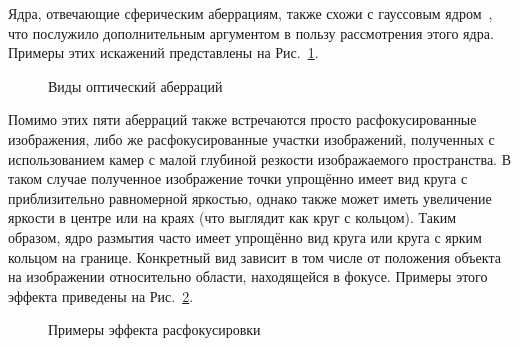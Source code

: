Ядра, отвечающие сферическим аберрациям, также схожи с гауссовым ядром~\cite{simpkins2014parameterized, simpkins2011modeling}, что послужило дополнительным аргументом в пользу рассмотрения этого ядра. Примеры этих искажений представлены на Рис.~\ref{fig:warping-aberrations}.

\begin{figure}[ht]
	\caption{Виды оптический аберраций~\cite{simpkins2011modeling}}
	\label{fig:warping-aberrations}
\end{figure}

Помимо этих пяти аберраций также встречаются просто расфокусированные изображения, либо же расфокусированные участки изображений, полученных с использованием камер с малой глубиной резкости изображаемого пространства. В таком случае полученное изображение точки упрощённо имеет вид круга с приблизительно равномерной яркостью, однако также может иметь увеличение яркости в центре или на краях (что выглядит как круг с кольцом). Таким образом, ядро размытия часто имеет упрощённо вид круга или круга с ярким кольцом на границе. Конкретный вид зависит в том числе от положения объекта на изображении относительно области, находящейся  в фокусе. Примеры этого эффекта приведены на Рис.~\ref{fig:warping-defocus}.

\begin{figure}[ht]
	\caption{Примеры эффекта расфокусировки}
	\label{fig:warping-defocus}
\end{figure}

